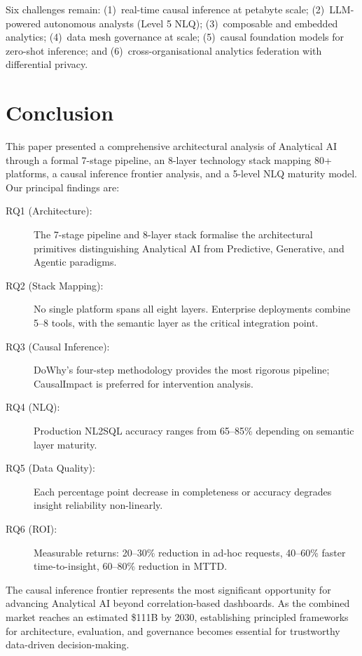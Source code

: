 \documentclass[preprint,12pt,authoryear]{elsarticle}
\theoremstyle{definition}
\begin{document}
Six challenges remain: (1)~real-time causal inference at petabyte scale; (2)~LLM-powered autonomous analysts (Level 5 NLQ); (3)~composable and embedded analytics; (4)~data mesh governance at scale; (5)~causal foundation models for zero-shot inference; and (6)~cross-organisational analytics federation with differential privacy.

\section{Conclusion}\label{sec:conclusion}

This paper presented a comprehensive architectural analysis of Analytical AI through a formal 7-stage pipeline, an 8-layer technology stack mapping 80+ platforms, a causal inference frontier analysis, and a 5-level NLQ maturity model. Our principal findings are:

\begin{description}
    \item[RQ1 (Architecture):] The 7-stage pipeline and 8-layer stack formalise the architectural primitives distinguishing Analytical AI from Predictive, Generative, and Agentic paradigms.
    \item[RQ2 (Stack Mapping):] No single platform spans all eight layers. Enterprise deployments combine 5--8 tools, with the semantic layer as the critical integration point.
    \item[RQ3 (Causal Inference):] DoWhy's four-step methodology provides the most rigorous pipeline; CausalImpact is preferred for intervention analysis.
    \item[RQ4 (NLQ):] Production NL2SQL accuracy ranges from 65--85\% depending on semantic layer maturity.
    \item[RQ5 (Data Quality):] Each percentage point decrease in completeness or accuracy degrades insight reliability non-linearly.
    \item[RQ6 (ROI):] Measurable returns: 20--30\% reduction in ad-hoc requests, 40--60\% faster time-to-insight, 60--80\% reduction in MTTD.
\end{description}

The causal inference frontier represents the most significant opportunity for advancing Analytical AI beyond correlation-based dashboards. As the combined market reaches an estimated \$111B by 2030, establishing principled frameworks for architecture, evaluation, and governance becomes essential for trustworthy data-driven decision-making.
\end{document}
